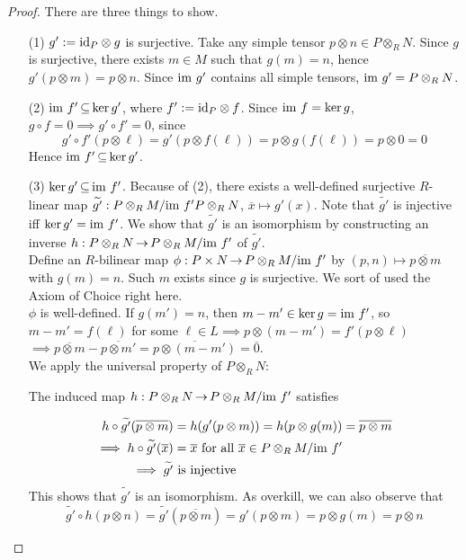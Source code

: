 \documentclass[11pt]{book}
\theoremstyle{definition}   \newtheorem{defn}[counter]{Definition} %
\newcommand{\ov}{\overline}   \newcommand{\wt}{\widetilde}
\DeclareMathOperator{\ra}{\rightarrow}   \DeclareMathOperator{\Poly}{\mathbf{P}}   \DeclareMathOperator{\spn}{\textnormal{span}}   \DeclareMathOperator{\aut}{\textnormal{Aut}}
\numberwithin{counter}{chapter}
\begin{document}
\begin{proof}
There are three things to show.
\begin{enumerate}
\item[(1)] $g' := \textnormal{id}_P \otimes g$ is surjective. Take any simple tensor $p \otimes n \in P \otimes_R N$. Since $g$ is surjective, there exists $m \in M$ such that $g(m) = n$, hence $g'(p \otimes m) = p \otimes n$. Since $\textnormal{im } g'$ contains all simple tensors, $\textnormal{im } g' = P \otimes_R N$. 

\item[(2)] $\textnormal{im } f' \operatorname{\subseteq} \ker g'$, where $f' := \textnormal{id}_P \otimes f$. Since $\textnormal{im } f = \ker g$, $g \circ f = 0 \implies g' \circ f' = 0$, since 
	\[g' \circ f'(p \otimes \ell) = g'(p \otimes f(\ell)) = p \otimes g(f(\ell)) = p \otimes 0 = 0 \]
Hence $\textnormal{im } f' \operatorname{\subseteq} \ker g'$. 

\item[(3)] $\ker g' \operatorname{\subseteq} \textnormal{im } f'$. Because of (2), there exists a well-defined surjective $R$-linear map $\wt{g'} : P \otimes_R M/\im f' P \otimes_R N$, $\ov{x} \mapsto g'(x)$. Note that $\wt{g'}$ is injective iff $\ker g' = \textnormal{im } f'$. We show that $\wt{g'}$ is an isomorphism by constructing an inverse $h : P \otimes_R N \ra P\otimes_R M/\im f'$ of $\wt{g'}$. \\

Define an $R$-bilinear map $\phi : P \times N \ra P \otimes_R M/\im f'$ by $(p,n) \mapsto \ov{p \otimes m}$ with $g(m) = n$. Such $m$ exists since $g$ is surjective. We sort of used the Axiom of Choice right here. \\

$\phi$ is well-defined. If $g(m') = n$, then $m-m' \in \ker g = \textnormal{im } f'$, so $m-m' = f(\ell)$ for some $\ell \in L \implies p \otimes (m-m') = f'(p \otimes \ell)$ $\implies \ov{p \otimes m} - \ov{p \otimes m'} = \ov{p \otimes (m-m')} = \ov{0}$. \\

We apply the universal property of $P \otimes_R N$: 
{\small{}}

The induced map $h : P \otimes_R N \ra P\otimes_R M/\im f'$ satisfies

\begin{align*}
h \circ \wt{g'}(\ov{p \otimes m}) &= h(g'(p \otimes m)) = h(p \otimes g(m)) = \ov{p \otimes m} \\
\implies h \circ \wt{g'}(\ov{x}) &= \ov{x} \tn{ for all } \ov{x} \in P \otimes_R M/\im f' \\
\implies \wt{g'} & \tn{ is injective} 
\end{align*}
This shows that $\wt{g'}$ is an isomorphism. As overkill, we can also observe that
\[\wt{g'} \circ h(p \otimes n) = \wt{g'}(\ov{p \otimes m}) = g'(p \otimes m) = p \otimes g(m) = p \otimes n \]
\end{enumerate}
\end{proof}
\end{document}
